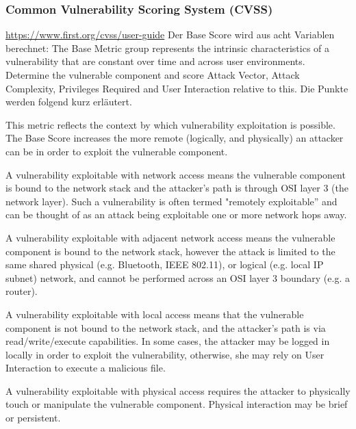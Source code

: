 \subsubsection{Common Vulnerability Scoring System (CVSS)}
\label{sec:sota_sa_cvss}
    \url{https://www.first.org/cvss/user-guide}
    Der Base Score wird aus acht Variablen berechnet:
    The Base Metric group represents the intrinsic characteristics of a vulnerability that are constant over time and across user environments. 
    Determine the vulnerable component and score Attack Vector, Attack Complexity, Privileges Required and User Interaction relative to this. 
    Die Punkte werden folgend kurz erläutert.
    \begin{description}[itemsep=1em,align=left]
        \item [Attack Vector:] This metric reflects the context by which vulnerability exploitation is possible. 
            The Base Score increases the more remote (logically, and physically) an attacker can be in order to exploit the vulnerable component.
            \begin{description}[noitemsep,align=left]
                \item [Network:] A vulnerability exploitable with network access means the vulnerable component is bound to the network stack and the attacker's path is through OSI layer 3 (the network layer). 
                Such a vulnerability is often termed "remotely exploitable” and can be thought of as an attack being exploitable one or more network hops away.
                \item [Adjacent:] A vulnerability exploitable with adjacent network access means the vulnerable component is bound to the network stack, however the attack is limited to the same shared physical (e.g. Bluetooth, IEEE 802.11), or logical (e.g. local IP subnet) network, and cannot be performed across an OSI layer 3 boundary (e.g. a router).
                \item [Local:] A vulnerability exploitable with local access means that the vulnerable component is not bound to the network stack, and the attacker’s path is via read/write/execute capabilities. 
                    In some cases, the attacker may be logged in locally in order to exploit the vulnerability, otherwise, she may rely on User Interaction to execute a malicious file.
                \item [Physical:] A vulnerability exploitable with physical access requires the attacker to physically touch or manipulate the vulnerable component. Physical interaction may be brief or persistent.

\end{description}
\end{description}
